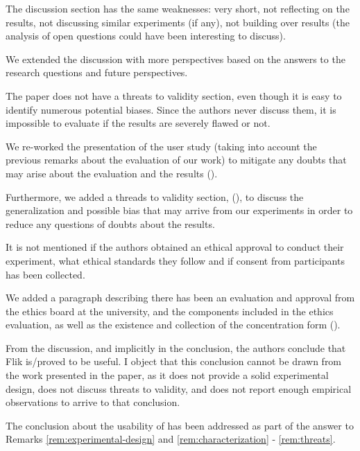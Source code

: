 \begin{remark} \label{rem:discussion}
The discussion section has the same weaknesses: very short, not reflecting on the results, not discussing similar experiments (if any), not building over results (the analysis of open questions could have been interesting to discuss).
\end{remark}
\begin{solved}
We extended the discussion with more perspectives based on the answers to the research questions and future perspectives.
\end{solved}

\begin{remark}\label{rem:threats}
The paper does not have a threats to validity section, even though it is easy to identify numerous potential biases. Since the authors never discuss them, it is impossible to evaluate if the results are severely flawed or not.
\end{remark}
\begin{solved}
We re-worked the presentation of the user study (taking into account the previous remarks about the evaluation of our work) to mitigate any doubts that may arise about the evaluation and the results ().

Furthermore, we added a threads to validity section,  (), to discuss the generalization and possible bias that may arrive from our experiments in order to reduce any questions of doubts about the results.
\end{solved}

\begin{remark} \label{rem:ethics}
It is not mentioned if the authors obtained an ethical approval to conduct their experiment, what ethical standards they follow and if consent from participants has been collected.
\end{remark}
\begin{solved}
We added a paragraph describing there has been an evaluation and approval from the ethics board at the university, and the components included in the ethics evaluation, as well as the existence and collection of the concentration form ().
\end{solved}

\begin{remark}
From the discussion, and implicitly in the conclusion, the authors conclude that Flik is/proved to be useful. I object that this conclusion cannot be drawn from the work presented in the paper, as it does not provide a solid experimental design, does not discuss threats to validity, and does not report enough empirical observations to arrive to that conclusion.
\end{remark}
\begin{solved}
The conclusion about the usability of \flik has been addressed as part of the answer to Remarks \ref{rem:experimental-design} and \ref{rem:characterization} - \ref{rem:threats}.
\end{solved}

